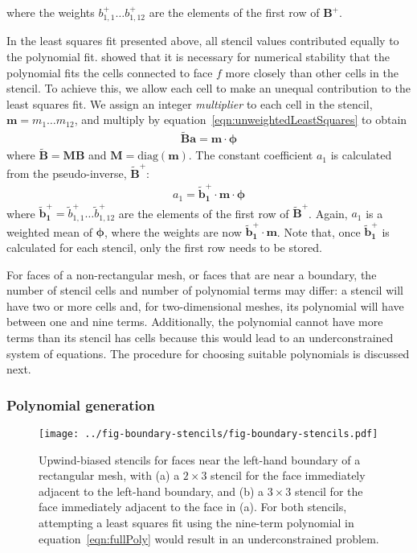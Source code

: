 where the weights $b_{1,1}^+ \ldots b_{1,12}^+$ are the elements of the first row of $\mathbf{B}^+$.

In the least squares fit presented above, all stencil values contributed equally to the polynomial fit.
\citet{lashley2002} showed that it is necessary for numerical stability that the polynomial fits the cells connected to face $f$ more closely than other cells in the stencil.
To achieve this, we allow each cell to make an unequal contribution to the least squares fit.
We assign an integer \textit{multiplier} to each cell in the stencil, $\mathbf{m} = m_1 \ldots m_{12}$, and multiply by equation~\eqref{eqn:unweightedLeastSquares} to obtain
\begin{align}
	\mathbf{\tilde{B}} \mathbf{a} = \mathbf{m} \cdot \bm{\phi}
\end{align}
where $\mathbf{\tilde{B}} = \mathbf{M} \mathbf{B}$ and $\mathbf{M} = \mathrm{diag}(\mathbf{m})$.  The constant coefficient $a_1$ is calculated from the pseudo-inverse, $\mathbf{\tilde{B}}^+$:
\begin{align}
	a_1 = \mathbf{\tilde{b}_1^+} \cdot \mathbf{m} \cdot \mathbf{\phi} \label{eqn:weightedPinv}
\end{align}
where $\mathbf{\tilde{b}_1^+} = \tilde{b}_{1,1}^+ \ldots \tilde{b}_{1,12}^+$ are the elements of the first row of $\mathbf{\tilde{B}}^+$.
Again, $a_1$ is a weighted mean of $\bm{\phi}$, where the weights are now $\mathbf{\tilde{b}_1^+} \cdot \mathbf{m}$.
Note that, once $\mathbf{\tilde{b}_1^+}$ is calculated for each stencil, only the first row needs to be stored.

For faces of a non-rectangular mesh, or faces that are near a boundary, the number of stencil cells and number of polynomial terms may differ: a stencil will have two or more cells and, for two-dimensional meshes, its polynomial will have between one and nine terms.  Additionally, the polynomial cannot have more terms than its stencil has cells because this would lead to an underconstrained system of equations.  The procedure for choosing suitable polynomials is discussed next.

\subsubsection{Polynomial generation}
\begin{figure}
	\centering
	\texttt{[image: ../fig-boundary-stencils/fig-boundary-stencils.pdf]}
	\caption{  Upwind-biased stencils for faces near the left-hand boundary of a rectangular mesh, with (a) a $2 \times 3$ stencil for the face immediately adjacent to the left-hand boundary, and (b) a $3 \times 3$ stencil for the face immediately adjacent to the face in (a).  For both stencils, attempting a least squares fit using the nine-term polynomial in equation~\eqref{eqn:fullPoly} would result in an underconstrained problem.}
	\label{fig:boundaryStencils}
\end{figure}

